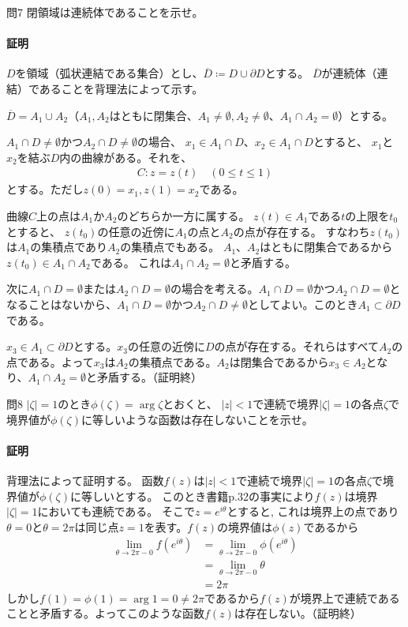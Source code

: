 \begin{mysimplebox}{問7}
    閉領域は連続体であることを示せ。
\end{mysimplebox}
\paragraph{証明}
$D$を領域（弧状連結である集合）とし、$\overline{D}\coloneqq D\cup\partial D$とする。
$\overline{D}$が連続体（連結）であることを背理法によって示す。

$\overline{D}=A_1\cup A_2$（$A_1, A_2$はともに閉集合、$A_1\neq\emptyset, A_2\neq\emptyset$、$A_1\cap A_2=\emptyset$）とする。

$A_1\cap D\neq\emptyset$かつ$A_2\cap D\neq\emptyset$の場合、
$x_1\in A_1\cap D$、$x_2\in A_1\cap D$とすると、
$x_1$と$x_2$を結ぶ$D$内の曲線がある。それを、
\begin{align*}
    C\colon z=z(t)\quad (0\le t \le 1)
\end{align*}
とする。ただし$z(0)=x_1, z(1)=x_2$である。

曲線$C$上の点は$A_1$か$A_2$のどちらか一方に属する。
$z(t)\in A_1$である$t$の上限を$t_0$とすると、
$z(t_0)$の任意の近傍に$A_1$の点と$A_2$の点が存在する。
すなわち$z(t_0)$は$A_1$の集積点であり$A_2$の集積点でもある。
$A_1$、$A_2$はともに閉集合であるから$z(t_0)\in A_1\cap A_2$である。
これは$A_1\cap A_2=\emptyset$と矛盾する。

次に$A_1\cap D=\emptyset$または$A_2\cap D=\emptyset$の場合を考える。$A_1\cap D=\emptyset$かつ$A_2\cap D=\emptyset$となることはないから、$A_1\cap D=\emptyset$かつ$A_2\cap D\neq\emptyset$としてよい。このとき$A_1\subset\partial D$である。

$x_3\in A_1\subset\partial D$とする。$x_3$の任意の近傍に$D$の点が存在する。それらはすべて$A_2$の点である。よって$x_3$は$A_2$の集積点である。$A_2$は閉集合であるから$x_3\in A_2$となり、$A_1\cap A_2=\emptyset$と矛盾する。（証明終）

\begin{mysimplebox}{問8}
    $|\zeta|=1$のとき$\phi(\zeta)=\arg \zeta$とおくと、
    $|z|<1$で連続で境界$|\zeta|=1$の各点$\zeta$で境界値が$\phi(\zeta)$に等しいような函数は存在しないことを示せ。
\end{mysimplebox}
\paragraph{証明}
背理法によって証明する。
函数$f(z)$は$|z|<1$で連続で境界$|\zeta|=1$の各点$\zeta$で境界値が$\phi(\zeta)$に等しいとする。
このとき書籍p.32の事実により$f(z)$は境界$|\zeta|=1$においても連続である。
そこで$z=e^{i\theta}$とすると,
これは境界上の点であり$\theta=0$と$\theta=2\pi$は同じ点$z=1$を表す。$f(z)$の境界値は$\phi(z)$であるから
\begin{align*}
    \lim_{\theta\to 2\pi-0}f(e^{i\theta})
    &=\lim_{\theta\to 2\pi-0}\phi(e^{i\theta})\\
    &=\lim_{\theta\to 2\pi-0}\theta\\
    &=2\pi
\end{align*}
しかし$f(1)=\phi(1)=\arg 1=0\neq 2\pi$であるから$f(z)$が境界上で連続であることと矛盾する。よってこのような函数$f(z)$は存在しない。（証明終）

